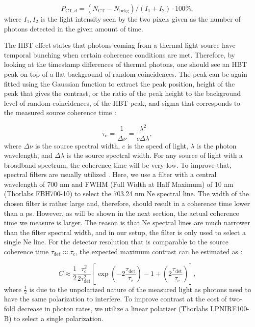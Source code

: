 \documentclass[a4paper,11pt]{article}
\begin{document}
\begin{equation}
    P_{\mathrm{CT}, d} = (N_{\mathrm{CT}} - N_{\mathrm{bckg}}) / (I_{1} + I_{2}) \cdot 100\%,
    \label{eq:CT_prob}
\end{equation}
where $I_{1}, I_{2}$ is the light intensity seen by the two pixels given as the number of photons detected in the given amount of time.

The HBT effect states that photons coming from a thermal light source have temporal bunching when certain coherence conditions are met. Therefore, by looking at the timestamp differences of thermal photons, one should see an HBT peak on top of a flat background of random coincidences. The peak can be again fitted using the Gaussian function to extract the peak position, height of the peak that gives the contrast, or the ratio of the peak height to the background level of random coincidences, of the HBT peak, and sigma that corresponds to the measured source coherence time \cite{karl2024photon}: 

\begin{equation}
    \tau_{\mathrm{c}} = \frac{1}{\Delta\nu}=\frac{\lambda^{2}}{c\Delta\lambda},
    \label{eq:coh_time}
\end{equation}
where $\Delta\nu$ is the source spectral width, $c$ is the speed of light, $\lambda$ is the photon wavelength, and $\Delta\lambda$ is the source spectral width. For any source of light with a broadband spectrum, the coherence time will be very low. To improve that, spectral filters are usually utilized \cite{guerin2017temporal, karl2024photon}. Here, we use a filter with a central wavelength of 700 nm and FWHM (Full Width at Half Maximum) of 10 nm (Thorlabs FBH700-10) to select the 703.24 nm Ne spectral line. The width of the chosen filter  is rather large 
and, therefore, should result in a coherence time lower than a ps. However, as will be shown in the next section, the actual coherence time we measure is larger. The reason is that Ne spectral lines are much narrower than the filter spectral width, and in our setup, the filter is only used to select a single Ne line. For the detector resolution that is comparable to the source coherence time $\tau_{\mathrm{det}} \approx \tau_{\mathrm{c}}$, the expected maximum contrast can be estimated as \cite{loudon2000quantum}:

\begin{equation}
    C \approx \frac{1}{2}\frac{\tau_{\mathrm{c}}^{2}}{2\tau_{\mathrm{det}}^{2}}\left[\exp\left(-2\frac{\tau_{\mathrm{det}}}{\tau_{\mathrm{c}}}\right) - 1 + \left(2\frac{\tau_{\mathrm{det}}}{\tau_{\mathrm{c}}}\right)\right],
    \label{eq:HBT_C}
\end{equation}
where $\frac{1}{2}$ is due to the unpolarized nature of the measured light as photons need to have the same polarization to interfere. To improve contrast at the cost of two-fold decrease in photon rates, we utilize a linear polarizer (Thorlabs LPNIRE100-B) to select a single polarization. 
\end{document}

